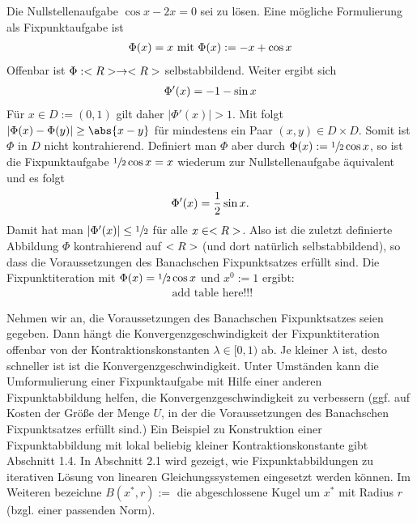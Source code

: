 \begin{example}
	Die Nullstellenaufgabe $\cos x - 2x = 0$ sei zu lösen. Eine mögliche Formulierung als Fixpunktaufgabe ist
	\begin{align}
	\Phi(x) = x \text{   mit  } \Phi(x) := -x + \cos x \notag
	\end{align}
	Offenbar ist $\Phi: <R> \to <R>$ selbstabbildend. Weiter ergibt sich
	\begin{align}
	\Phi'(x) = -1 - \sin x \notag
	\end{align}
	Für $x \in D := (0,1)$ gilt daher $\vert \Phi' (x)\vert > 1$. Mit  folgt $\vert \Phi(x) - \Phi(y)\vert \ge \abs{x-y}$ für mindestens ein Paar $(x,y) \in D \times D$. Somit ist $\Phi$ in $D$ nicht kontrahierend.
	Definiert man $\Phi$ aber durch $\Phi(x) := \sfrac{1}{2}\cos x$, so ist die Fixpunktaufgabe $\sfrac{1}{2}\cos x = x$ wiederum zur Nullstellenaufgabe äquivalent und es folgt
	\begin{align}
	\Phi'(x) = \frac{1}{2}\sin x. \notag
	\end{align} 
	Damit hat man $\vert \Phi'(x)\vert \le \sfrac{1}{2}$ für alle $x \in <R>$. Also ist die zuletzt definierte Abbildung $\Phi$ kontrahierend auf $<R>$ (und dort natürlich selbstabbildend), so dass die Voraussetzungen des Banachschen Fixpunktsatzes erfüllt sind. Die Fixpunktiteration mit $\Phi(x) = \sfrac{1}{2}\cos x$ und $x^0 := 1$ ergibt:
	\begin{align}
	\text{ add table here!!!}
	\end{align} %
\end{example}

Nehmen wir an, die Voraussetzungen des Banachschen Fixpunktsatzes seien gegeben. Dann hängt die Konvergenzgeschwindigkeit der Fixpunktiteration offenbar von der Kontraktionskonstanten $\lambda \in [0,1)$ ab. Je kleiner $\lambda$ ist, desto schneller ist ist die Konvergenzgeschwindigkeit. Unter Umständen kann die Umformulierung einer Fixpunktaufgabe mit Hilfe einer anderen Fixpunktabbildung helfen, die Konvergenzgeschwindigkeit zu verbessern (ggf. auf Kosten der Größe der Menge $U$, in der die Voraussetzungen des Banachschen Fixpunktsatzes erfüllt sind.) Ein Beispiel zu Konstruktion einer Fixpunktabbildung mit lokal beliebig kleiner Kontraktionskonstante gibt Abschnitt 1.4. In Abschnitt 2.1 wird gezeigt, wie Fixpunktabbildungen zu iterativen Lösung von linearen Gleichungssystemen eingesetzt werden können.
Im Weiteren bezeichne $B(x^{\ast}, r) :=$ die abgeschlossene Kugel um $x^{\ast}$ mit Radius $r$ (bzgl. einer passenden Norm).

